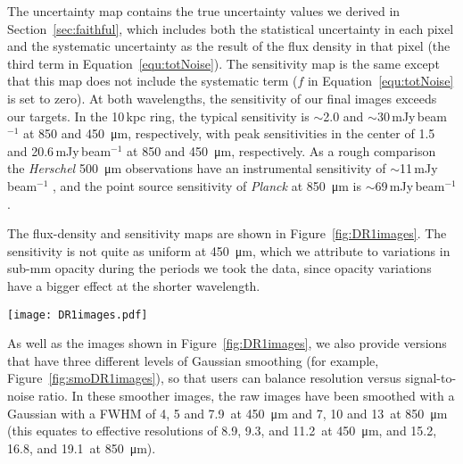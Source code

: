 \documentclass[a4paper,fleqn,usenatbib, twocolumn]{aastex63}
\begin{document}
The uncertainty map contains the true uncertainty values we derived
in Section~\ref{sec:faithful}, which includes both the statistical uncertainty in
each pixel and the systematic uncertainty as the result of the flux density
in that pixel (the third term in Equation~\ref{equ:totNoise}). The sensitivity map is the same
except that this map does not include the systematic term ($f$ in Equation~\ref{equ:totNoise} is set to zero). At both wavelengths, the sensitivity of our final images exceeds our
targets. In the 10\,kpc ring, the typical sensitivity is $\sim$2.0 and $\sim$30\,mJy\,beam$^{-1}$ at 850 and \SI{450}{\micro\meter}, respectively, with peak
sensitivities in the center of 1.5 and 20.6\,mJy\,beam$^{-1}$ at 850 and \SI{450}{\micro\meter},
respectively. As a rough comparison the \textit{Herschel} \SI{500}{\micro\meter} observations have an instrumental sensitivity of $\sim$11\,mJy\,beam$^{-1}$ \citep{Smith2017},
and the point source sensitivity of \textit{Planck} at \SI{850}{\micro\meter} is $\sim$69\,mJy\,beam$^{-1}$ \citep{Planck2014b}.

The flux-density and sensitivity maps are shown in Figure~\ref{fig:DR1images}. 
The sensitivity is not quite as uniform at \SI{450}{\micro\meter}, which we attribute to variations in sub-mm opacity during the periods we took the data, since 
opacity variations have a bigger effect at the shorter wavelength.


\begin{figure*}
  \centering
  \texttt{[image: DR1images.pdf]}
  \caption{Our final 450 and \SI{850}{\micro\meter} images and sensitivity maps for HASHTAG Data Release~1. 
           The colored regions of the images are approximately where our observations and complete and at our
           full sensitivity (equivalently, the grey-scale shows regions where observations are still ongoing). The images
           have a resolution of 7.9\arcsec\ and 13.0\arcsec (FWHM), at 450 and \SI{850}{\micro\meter}, respectively, and are available 
           in both mJy\,beam$^{-1}$ and mJy\,arcsec$^{-2}$ units.
           The sensitivity maps are shown on a log scale and are described
           in Section~\ref{sec:finalMaps}.}
  \label{fig:DR1images}
\end{figure*} 

As well as the images shown in Figure~\ref{fig:DR1images}, we also provide versions that have three different levels of Gaussian smoothing 
(for example, Figure~\ref{fig:smoDR1images}), so that users can balance resolution versus signal-to-noise ratio. In these smoother images, the raw images have been
smoothed with a Gaussian with a FWHM of
4, 5 and 7.9\arcsec\ at \SI{450}{\micro\meter} and  7, 10 and 13\arcsec\ at \SI{850}{\micro\meter} (this equates to effective resolutions of
8.9, 9.3, and 11.2\arcsec\ at \SI{450}{\micro\meter}, and 15.2, 16.8, and 19.1\arcsec\ at \SI{850}{\micro\meter}). 
\end{document}
